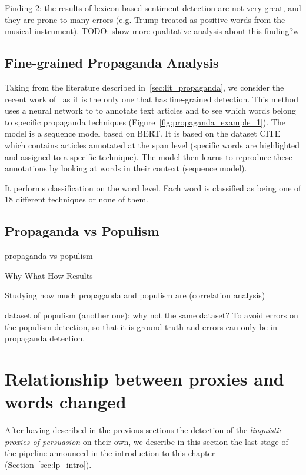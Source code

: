 Finding 2: the results of lexicon-based sentiment detection are not very great, and they are prone to many errors (e.g. Trump treated as positive words from the musical instrument).
TODO: show more qualitative analysis about this finding?w

\subsection{\statusorange Fine-grained Propaganda Analysis}

Taking from the literature described in~\ref{sec:lit_propaganda}, we consider the recent work of~\cite{da2019fine} as it is the only one that has fine-grained detection. This method uses a neural network to to annotate text articles and to see which words belong to specific propaganda techniques (Figure~\ref{fig:propaganda_example_1}).
The model is a sequence model based on BERT. It is based on the dataset CITE which contains articles annotated at the span level (specific words are highlighted and assigned to a specific technique). The model then learns to reproduce these annotations by looking at words in their context (sequence model).

It performs classification on the word level. Each word is classified as being one of 18 different techniques or none of them.



\subsection{\statusred Propaganda vs Populism}

propaganda vs populism

Why
What
How
Results

Studying how much propaganda and populism are (correlation analysis)

dataset of populism (another one): why not the same dataset? To avoid errors on the populism detection, so that it is ground truth and errors can only be in propaganda detection.


\section{Relationship between proxies and words changed}
\label{sec:lp_relationship}

After having described in the previous sections the detection of the \emph{linguistic proxies of persuasion} on their own, we describe in this section the last stage of the pipeline announced in the introduction to this chapter (Section~\ref{sec:lp_intro}).

